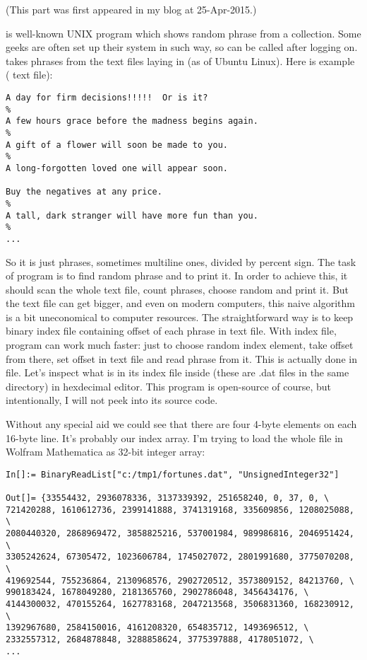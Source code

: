 
(This part was first appeared in my blog at 25-Apr-2015.)

 is well-known UNIX program which shows random phrase from a collection.
Some geeks are often set up their system in such way, so  can be called after logging on.
 takes phrases from the text files laying in  (as of Ubuntu Linux).
Here is example ( text file):

\begin{lstlisting}
A day for firm decisions!!!!!  Or is it?
%
A few hours grace before the madness begins again.
%
A gift of a flower will soon be made to you.
%
A long-forgotten loved one will appear soon.

Buy the negatives at any price.
%
A tall, dark stranger will have more fun than you.
%
...
\end{lstlisting}

So it is just phrases, sometimes multiline ones, divided by percent sign.
The task of  program is to find random phrase and to print it.
In order to achieve this, it should scan the whole text file, count phrases, choose random and print it.
But the text file can get bigger, and even on modern computers, this naive algorithm is a bit uneconomical to computer resources.
The straightforward way is to keep binary index file containing offset of each phrase in text file.
With index file,  program can work much faster: just to choose random index element, take offset from there, set offset in text file and read phrase from it.
This is actually done in  file.
Let's inspect what is in its index file inside (these are .dat files in the same directory) in hexdecimal editor.
This program is open-source of course, but intentionally, I will not peek into its source code.



Without any special aid we could see that there are four 4-byte elements on each 16-byte line.
It's probably our index array.
I'm trying to load the whole file in Wolfram Mathematica as 32-bit integer array:

\begin{lstlisting}
In[]:= BinaryReadList["c:/tmp1/fortunes.dat", "UnsignedInteger32"]

Out[]= {33554432, 2936078336, 3137339392, 251658240, 0, 37, 0, \
721420288, 1610612736, 2399141888, 3741319168, 335609856, 1208025088, \
2080440320, 2868969472, 3858825216, 537001984, 989986816, 2046951424, \
3305242624, 67305472, 1023606784, 1745027072, 2801991680, 3775070208, \
419692544, 755236864, 2130968576, 2902720512, 3573809152, 84213760, \
990183424, 1678049280, 2181365760, 2902786048, 3456434176, \
4144300032, 470155264, 1627783168, 2047213568, 3506831360, 168230912, \
1392967680, 2584150016, 4161208320, 654835712, 1493696512, \
2332557312, 2684878848, 3288858624, 3775397888, 4178051072, \
...
\end{lstlisting}

